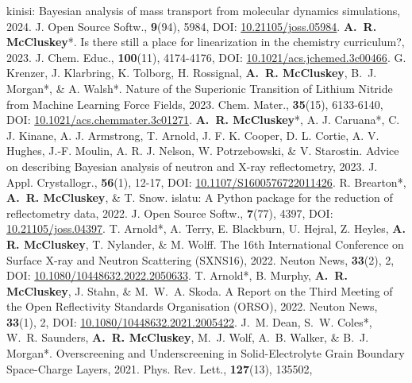 \begin{benumerate}{25}
    {kinisi: Bayesian analysis of mass transport from molecular dynamics simulations,}
    {2024.}
    {J. Open Source Softw.,}
    {\textbf{9}(94), 5984,}
    {DOI: \href{https://doi.org/10.21105/joss.05984}{10.21105/joss.05984}.}
   \cvpuby
    {\textbf{A.~R. McCluskey}*.}
    {Is there still a place for linearization in the chemistry curriculum?,}
    {2023.}
    {J. Chem. Educ.,}
    {\textbf{100}(11), 4174-4176,}
    {DOI: \href{https://doi.org/10.1021/acs.jchemed.3c00466}{10.1021/acs.jchemed.3c00466}.}
  \cvpuby
    {G. Krenzer, J. Klarbring, K. Tolborg, H. Rossignal, \textbf{A.~R. McCluskey}, B.~J. Morgan*, \& A. Walsh*.}
    {Nature of the Superionic Transition of Lithium Nitride from Machine Learning Force Fields,}
    {2023.}
    {Chem. Mater.,}
    {\textbf{35}(15), 6133-6140,}
    {DOI: \href{https://doi.org/10.1021/acs.chemmater.3c01271}{10.1021/acs.chemmater.3c01271}.}
  \cvpuby
    {\textbf{A.~R. McCluskey}*, A. J. Caruana*, C. J. Kinane, A. J. Armstrong, T. Arnold, J. F. K. Cooper, D. L. Cortie, A. V. Hughes, J.-F. Moulin, A. R. J. Nelson, W. Potrzebowski, \& V. Starostin.}
    {Advice on describing Bayesian analysis of neutron and X-ray reflectometry,}
    {2023.}
    {J. Appl. Crystallogr.,}
    {\textbf{56}(1), 12-17,}
    {DOI: \href{https://doi.org/10.1107/S1600576722011426}{10.1107/S1600576722011426}.}
  \cvpuby
    {R. Brearton*, \textbf{A.~R. McCluskey}, \& T. Snow.}
    {islatu: A Python package for the reduction of reflectometry data,}
    {2022.}
    {J. Open Source Softw.,}
    {\textbf{7}(77), 4397,}
    {DOI: \href{https://doi.org/10.21105/joss.04397}{10.21105/joss.04397}.}
  \cvpuby
    {T. Arnold*, A. Terry, E. Blackburn, U. Hejral, Z. Heyles, \textbf{A. R. McCluskey}, T. Nylander, \& M. Wolff.}
    {The 16th International Conference on Surface X-ray and Neutron Scattering (SXNS16),}
    {2022.}
    {Neuton News,}
    {\textbf{33}(2), 2,}
    {DOI: \href{https://doi.org/10.1080/10448632.2022.2050633}{10.1080/10448632.2022.2050633}.}
  \cvpuby
    {T. Arnold*, B. Murphy, \textbf{A.~R. McCluskey}, J. Stahn, \& M.~W.~A. Skoda.}
    {A Report on the Third Meeting of the Open Reflectivity Standards Organisation (ORSO),}
    {2022.}
    {Neuton News,}
    {\textbf{33}(1), 2,}
    {DOI: \href{https://doi.org/10.1080/10448632.2021.2005422}{10.1080/10448632.2021.2005422}.}
  \cvpuby
    {J.~M. Dean, S.~W. Coles*, W.~R. Saunders, \textbf{A.~R. McCluskey}, M.~J. Wolf, A.~B. Walker, \& B.~J. Morgan*.}
    {Overscreening and Underscreening in Solid-Electrolyte Grain Boundary Space-Charge Layers,}
    {2021.}
    {Phys. Rev. Lett.,}
    {\textbf{127}(13), 135502,}

\end{benumerate}
